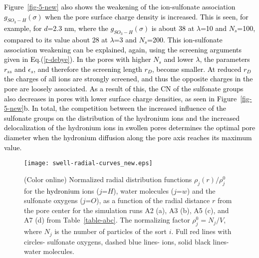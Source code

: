 \documentclass[3p,english,preprint]{elsarticle}
\newcommand{\need}[1]{\textcolor{black}{#1}}
\newcommand{\mage}[1]{\textcolor{black}{#1}}
\begin{document}
{\need{
Figure~\ref{fig-5-new} also shows the weakening of the ion-sulfonate association  $g_{SO_3-H}(\sigma)$
 when the pore surface charge density  is increased. 
This is seen, for example,  for $d$=2.3 nm, where
 the  $g_{SO_3-H}(\sigma)$  is about 38 at $\lambda$=10 and  $N_s$=100,
compared to its  value       about 28 at $\lambda$=3  and  $N_s$=200. 
This ion-sulfonate association weakening  can be explained,  again,  using the 
screening arguments given in Eq.(\ref{r-debye}). In the pores with higher $N_s$ and  lower 
$\lambda$, the parameters  $r_{ss}$ and $\epsilon_s$, 
and therefore the screening length $r_D$,  become smaller. 
 At reduced $r_D$ the charges of all ions are strongly screened, and 
thus the opposite charges in the pore are loosely associated. 
As a result of this, the CN of the sulfonate groups also decreases in pores with lower
surface charge densities, as seen in Figure~\ref{fig-5-new}b. 
%
%
In total, 
the competition between the increased influence of the sulfonate groups on the 
distribution of the hydronium ions and the increased delocalization of the hydronium ions 
in swollen pores determines the optimal pore diameter when the hydronium diffusion 
along the pore axis reaches its  maximum value. 
}}


\begin{figure}  [!ht]
\begin{center}
\texttt{[image: swell-radial-curves\_new.eps]}
\end{center}
\vspace{-0.7cm}
\caption{(Color online)  Normalized radial distribution
  functions $\rho_j(r)/\rho_j^0$ for the 
{\need{ 
hydronium 
}}
 ions ($j$=$H$), water molecules ($j$=$w$) and 
  the sulfonate oxygens ($j$=$O$), 
as a function of the radial distance $r$ from  the pore center
 for the simulation runs A2 (a), A3 (b), A5 (c), and A7 (d) from
  Table~\ref{table-abc}.   The normalizing
  factor $\rho_j^0=N_j/V$, where %
$N_j$ is the  number of particles of the sort $i$. 
Full red lines with circles- sulfonate oxygens, dashed blue lines- ions, 
solid black lines- water molecules.
 \label{fig-6-new}}
\end{figure}
\end{document}
